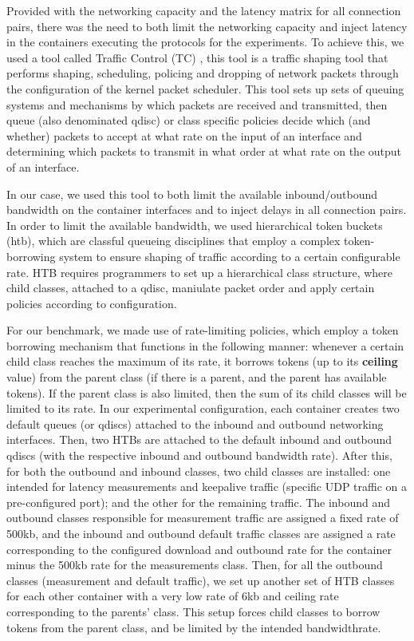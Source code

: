 Provided with the networking capacity and the latency matrix for all connection pairs, there was the need to both limit the networking capacity and inject latency in the containers executing the protocols for the experiments. To achieve this, we used a tool called Traffic Control (TC) , this tool is a traffic shaping tool that performs shaping, scheduling, policing and dropping of network packets through the configuration of the kernel packet scheduler. This tool sets up sets of queuing systems and mechanisms by which packets are received and transmitted, then queue (also denominated qdisc) or class specific policies decide which (and whether) packets to accept at what rate on the input of an interface and determining which packets to transmit in what order at what rate on the output of an interface. 

In our case, we used this tool to both limit the available inbound/outbound bandwidth on the container interfaces and to inject delays in all connection pairs. In order to limit the available bandwidth, we used hierarchical token buckets (htb), which are classful queueing disciplines that employ a complex token-borrowing system to ensure shaping of traffic according to a certain configurable rate. HTB requires programmers to set up a hierarchical class structure, where child classes, attached to a qdisc, maniulate packet order and apply certain policies according to configuration.

For our benchmark, we made use of rate-limiting policies, which employ a token borrowing mechanism that functions in the following manner: whenever a certain child class reaches the maximum of its rate, it borrows tokens (up to its \textbf{ceiling} value) from the parent class (if there is a parent, and the parent has available tokens). If the parent class is also limited, then the sum of its child classes will be limited to its rate. In our experimental configuration, each container creates two default queues (or qdiscs) attached to the inbound and outbound networking interfaces. Then, two HTBs are attached to the default inbound and outbound qdiscs (with the respective inbound and outbound bandwidth rate). After this, for both the outbound and inbound classes, two child classes are installed: one intended for latency measurements and keepalive traffic (specific UDP traffic on a pre-configured port); and the other for the remaining traffic. The inbound and outbound classes responsible for measurement traffic are assigned a fixed rate of 500kb, and the inbound and outbound default traffic classes are assigned a rate corresponding to the configured download and outbound rate for the container minus the 500kb rate for the measurements class. Then, for all the outbound classes (measurement and default traffic), we set up another set of HTB classes for each other container with a very low rate of 6kb and ceiling rate corresponding to the parents' class. This setup forces child classes to borrow tokens from the parent class, and be limited by the intended bandwidthrate.

